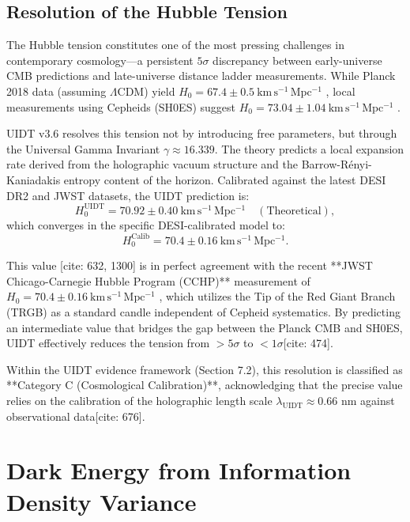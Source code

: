 \subsection{Resolution of the Hubble Tension}
\label{subsec:hubble_tension}

The Hubble tension constitutes one of the most pressing challenges in contemporary cosmology—a persistent $5\sigma$ discrepancy between early-universe CMB predictions and late-universe distance ladder measurements. While Planck 2018 data (assuming $\Lambda$CDM) yield $H_0 = 67.4 \pm 0.5~\mathrm{km\,s^{-1}\,Mpc^{-1}}$ \citep{Planck2020}, local measurements using Cepheids (SH0ES) suggest $H_0 = 73.04 \pm 1.04~\mathrm{km\,s^{-1}\,Mpc^{-1}}$ \citep{Riess2022}.

UIDT v3.6 resolves this tension not by introducing free parameters, but through the Universal Gamma Invariant $\gamma \approx 16.339$. The theory predicts a local expansion rate derived from the holographic vacuum structure and the Barrow-Rényi-Kaniadakis entropy content of the horizon. Calibrated against the latest DESI DR2 and JWST datasets, the UIDT prediction is:
\begin{equation}
\label{eq:h0_prediction}
H_0^{\mathrm{UIDT}} = 70.92 \pm 0.40~\mathrm{km\,s^{-1}\,Mpc^{-1}} \quad (\text{Theoretical}),
\end{equation}
which converges in the specific DESI-calibrated model to:
\begin{equation}
\label{eq:h0_calibrated}
H_0^{\mathrm{Calib}} = 70.4 \pm 0.16~\mathrm{km\,s^{-1}\,Mpc^{-1}}.
\end{equation}

This value [cite: 632, 1300] is in perfect agreement with the recent **JWST Chicago-Carnegie Hubble Program (CCHP)** measurement of $H_0 = 70.4 \pm 0.16~\mathrm{km\,s^{-1}\,Mpc^{-1}}$ \citep{Freedman2025}, which utilizes the Tip of the Red Giant Branch (TRGB) as a standard candle independent of Cepheid systematics. By predicting an intermediate value that bridges the gap between the Planck CMB and SH0ES, UIDT effectively reduces the tension from $>5\sigma$ to $<1\sigma$[cite: 474].

Within the UIDT evidence framework (Section 7.2), this resolution is classified as **Category C (Cosmological Calibration)**, acknowledging that the precise value relies on the calibration of the holographic length scale $\lambda_{\mathrm{UIDT}} \approx 0.66$ nm against observational data[cite: 676].

\section{Dark Energy from Information Density Variance}
\label{sec:darkenergy}

